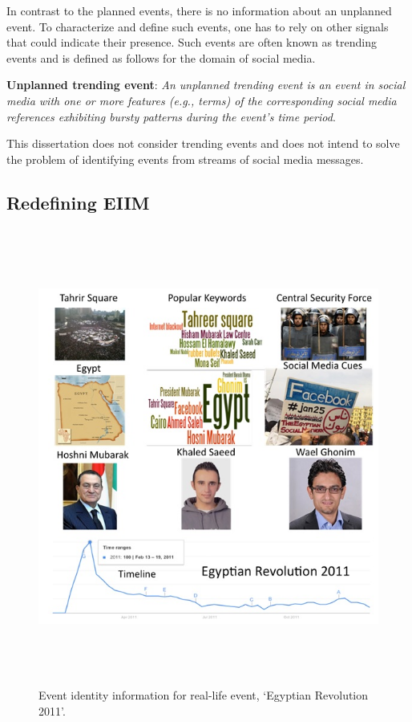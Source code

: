 In contrast to the planned events, there is no information about an unplanned event. To characterize and define such events, one has to rely on other signals that could indicate their presence. Such events are often known as trending events and is defined as follows for the domain of social media.

\noindent \textbf{Unplanned trending event}: \textit{An unplanned trending event is an event in social media with one or more features (e.g., terms) of the corresponding social media references exhibiting bursty patterns during the event's time period}.

This dissertation does not consider trending events and does not intend to solve the problem of identifying events from streams of social media messages.

\subsection{Redefining EIIM}

\begin{figure}[htbp]
  \caption{Event identity information for real-life event, `Egyptian Revolution 2011'.}
\label{eventidentity}
  \centering
    \includegraphics[width=15cm,height=15cm]{Figures/eventIdentity.jpg}
\end{figure}



